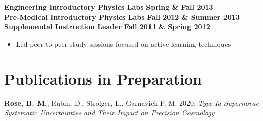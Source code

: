 \documentclass[margin]{res}
\begin{document}
\begin{resume}
\textbf{Engineering Introductory Physics Labs} \hfill{} \textbf{Spring \& Fall 2013}\\
\textbf{Pre-Medical Introductory Physics Labs} \hfill{} \textbf{Fall 2012 \& Summer 2013}\\
{\bf Supplemental Instruction Leader} \hfill{} \textbf{Fall 2011 \& Spring 2012}
    \begin{itemize}\itemsep -2pt
    \item[] Led peer-to-peer study sessions focused on active learning techniques
    \end{itemize}

\begin{comment}
year |   Fall        | Spring        | Summer
1st  | Labs-premed   | labs-eng      | labs-premed
2nd  | Labs-eng      | RA            | RA
3rd  | RA/IntroAstro | Peter's intro | RA
4th  | IntroAstro    | Python        | RA
5th  | Physics C HW  | RA            | RA & REU classes
6th  | Fellowship (GRE Class) | Python | NA!?!
\end{comment}













\section{Publications in Preparation}



\hangindent=15pt 
{\bf Rose, B. M.}, Rubin, D., Strolger, L., Garnavich P. M. 2020, {\sl Type Ia Supernovae Systematic Uncertainties and Their Impact on Precision Cosmology}


\end{resume}
\end{document}
